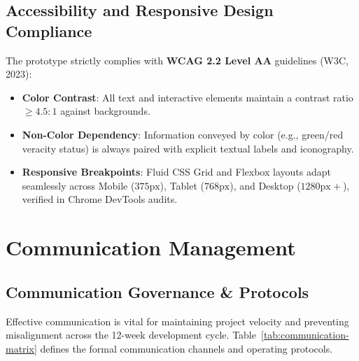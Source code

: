 \documentclass[11pt, a4paper]{article}
\begin{document}
\subsection{Accessibility and Responsive Design Compliance}
The prototype strictly complies with \textbf{WCAG 2.2 Level AA} guidelines (W3C, 2023):
\begin{itemize}
  \item \textbf{Color Contrast}: All text and interactive elements maintain a contrast ratio $\ge 4.5:1$ against backgrounds.
  \item \textbf{Non-Color Dependency}: Information conveyed by color (e.g., green/red veracity status) is always paired with explicit textual labels and iconography.
  \item \textbf{Responsive Breakpoints}: Fluid CSS Grid and Flexbox layouts adapt seamlessly across Mobile ($375\text{px}$), Tablet ($768\text{px}$), and Desktop ($1280\text{px}+$), verified in Chrome DevTools audits.
\end{itemize}

\section{Communication Management}
\label{sec:communication}

\subsection{Communication Governance \& Protocols}
Effective communication is vital for maintaining project velocity and preventing misalignment across the 12-week development cycle. Table~\ref{tab:communication-matrix} defines the formal communication channels and operating protocols.
\end{document}
